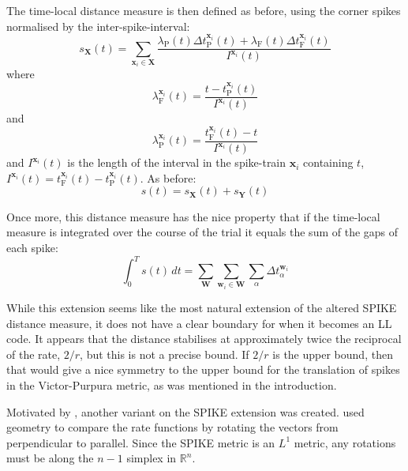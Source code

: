 The time-local distance measure is then defined as before, using the corner spikes normalised by the inter-spike-interval:
\begin{equation}
s_{\mathbf{X}}(t) = \sum_{\mathbf{x}_i \in \mathbf{X}} \frac{\lambda_{\mathrm{P}}(t)\Delta t_{\mathrm{P}}^{\mathbf{x}_i} (t) + \lambda_{\mathrm{F}}(t)\Delta t_{\mathrm{F}}^{\mathbf{x}_i}(t) }{I^{\mathbf{x}_i}(t) }%
\end{equation}
where 
\begin{equation}
\lambda_{\mathrm{F}}^{\mathbf{x}_i}(t) =\frac{ t-t_{\mathrm{P}}^{\mathbf{x}_i}(t)}{I^{\mathbf{x}_i}(t)}%
\end{equation}
and
\begin{equation}
 \lambda_{\mathrm{P}}^{\mathbf{x}_i}(t) =\frac{ t_{\mathrm{F}}^{\mathbf{x}_i}(t) - t}{I^{\mathbf{x}_i}(t)}%
\end{equation}
and $I^{\mathbf{x}_i}(t)$ is the length of the interval in the spike-train $\mathbf{x}_i$ containing $t$, $I^{\mathbf{x}_i}(t) = t_{\mathrm{F}}^{\mathbf{x}_i}(t) - t_{\mathrm{P}}^{\mathbf{x}_i}(t)$.
 As before:
\begin{equation}
s(t) = s_{\mathbf{X}}(t) + s_{\mathbf{Y}}(t)
\end{equation}

Once more, this distance measure has the nice property that if the time-local measure is integrated over the course of the trial it equals the sum of the gaps of each spike:
\begin{equation}
\int_0^T s(t)\,dt = \sum_{\mathbf{W}} \sum_{\mathbf{w}_i \in \mathbf{W}} \sum_{\alpha} \Delta t_{\alpha}^{\mathbf{w}_i}
\end{equation}

While this extension seems like the most natural extension of the altered SPIKE distance measure, it does not have a clear boundary for when it becomes an LL code.  It appears that the distance stabilises at approximately twice the reciprocal of the rate, $2/r$, but this is not a precise bound.  If $2/r$ is the upper bound, then that would give a nice symmetry to the upper bound for the translation of spikes in the Victor-Purpura metric, as was mentioned in the introduction.

Motivated by \citep{HoughtonSen2008a}, another variant on the SPIKE extension was created.  \citet{HoughtonSen2008a} used geometry to compare the rate functions by rotating the vectors from perpendicular to parallel.  Since the SPIKE metric is an $L^1$ metric, any rotations must be along the $n-1$ simplex in $\mathbb{R}^n$.

